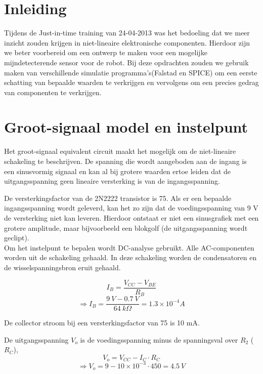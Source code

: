\documentclass[11pt]{article}
\begin{document}
\section{Inleiding}
Tijdens de Just-in-time training van 24-04-2013 was het bedoeling dat we meer inzicht zouden krijgen in niet-lineaire elektronische componenten. Hierdoor 
zijn we beter voorbereid om een ontwerp te maken voor een mogelijke mijndetecterende sensor voor de robot. Bij deze opdrachten zouden we gebruik maken van verschillende simulatie programma's(Falstad en SPICE)
om een eerste schatting van bepaalde waarden te verkrijgen en vervolgens om een precies gedrag van componenten te verkrijgen.



\section{Groot-signaal model en instelpunt}

Het groot-signaal equivalent circuit maakt het mogelijk om de niet-lineaire schakeling te beschrijven. De spanning die wordt aangeboden aan de ingang is een sinusvormig signaal en kan al bij grotere waarden ertoe leiden dat de uitgangsspanning geen lineaire versterking is van de ingangsspanning.

De versterkingsfactor van de 2N2222 transistor is 75. Als er een bepaalde ingangsspanning wordt geleverd, kan het zo zijn dat de voedingsspanning van 9 V de versterking niet kan leveren. Hierdoor ontstaat er niet een sinusgrafiek met een grotere amplitude, maar bijvoorbeeld een blokgolf (de uitgangsspanning wordt geclipt).\\

Om het instelpunt te bepalen wordt DC-analyse gebruikt. Alle AC-componenten worden uit de schakeling gehaald. In deze schakeling worden de condensatoren en de wisselspanningsbron eruit gehaald.

\begin{equation}
I_B=\frac{V_{CC}-V_{BE}}{R_B}
\end{equation}
$$\Rightarrow I_B=\frac{9\: V-0.7 \: V}{64 \: k \Omega}=1.3\times 10^{-4}A$$

\noindent De collector stroom bij een versterkingsfactor van 75 is 10 mA. 

\noindent De uitgangsspanning $V_o$ is de voedingsspanning minus de spanningsval over $R_2$ ($R_C$),
\begin{equation}
V_o=V_{CC}-I_{C} \cdot R_{C}
\end{equation}
$$\Rightarrow V_o=9-10\times 10^{-3}\cdot 450=4.5 \: V$$
\end{document}
